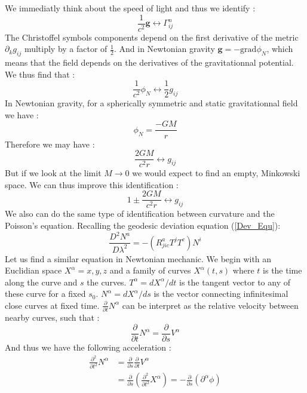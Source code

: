 \documentclass[a4paper,12pt]{article}
\theoremstyle{definition}
\begin{document}
We immediatly think about the speed of light and thus we identify :
\begin{equation}
	\frac{1}{c^2} \boldsymbol{g} \longleftrightarrow \Gamma^n_{ij}
\end{equation}
The Christoffel symbols components depend on the first derivative of the metric $\partial_kg_{ij}$ multiply by a factor of $\frac{1}{2}$.
And in Newtonian gravity $\boldsymbol{g}=-\text{grad}\phi_N$, which means that the field depends on the derivatives of the gravitationnal potential.
We thus find that :
\begin{equation}
	\frac{1}{c^2}\phi_N \longleftrightarrow \frac{1}{2}g_{ij}
\end{equation}
In Newtonian gravity, for a spherically symmetric and static gravitationnal field we have :
\begin{equation}
	\phi_N=\frac{-GM}{r}
\end{equation}
Therefore we may have :
\begin{equation}
	\frac{2GM}{c^2r} \longleftrightarrow g_{ij}
\end{equation}
But if we look at the limit $M\rightarrow 0$ we would expect to find an empty, Minkowski space.
We can thus improve this identification :
\begin{equation}
	1\pm\frac{2GM}{c^2r} \longleftrightarrow g_{ij}
\end{equation}
We also can do the same type of identification between curvature and the Poisson's equation.
Recalling the geodesic deviation equation (\ref{Dev_Equ}):
\begin{equation}\label{Dev_Equ2}
	\frac{D^2N^a}{D\lambda^2}=-(R_{jic}^aT^jT^c)N^i
\end{equation}
Let us find a similar equation in Newtonian mechanic.
We begin with an Euclidian space $X^\alpha={x,y,z}$ and a family of curves $X^\alpha(t,s)$ where $t$ is the time along the curve and $s$ the curves.
$T^\alpha=dX^\alpha/dt$ is the tangent vector to any of these curve for a fixed $s_0$.
$N^\alpha=dX^\alpha/ds$ is the vector connecting infinitesimal close curves at fixed time.
$\frac{\partial}{\partial t}N^\alpha$ can be interpret as the relative velocity between nearby curves, such that :
\begin{equation}
	\frac{\partial}{\partial t}N^\alpha=\frac{\partial}{\partial s}V^\alpha
\end{equation}
And thus we have the following acceleration :
\begin{equation}
\begin{split}
	\frac{\partial^2}{\partial t^2}N^\alpha&=\frac{\partial}{\partial s}\frac{\partial}{\partial t}V^\alpha \\
	&=\frac{\partial}{\partial s}(\frac{\partial^2}{\partial t^2}X^\alpha)=-\frac{\partial}{\partial s}(\partial^\alpha \phi)
\end{split}
\end{equation}
\end{document}
